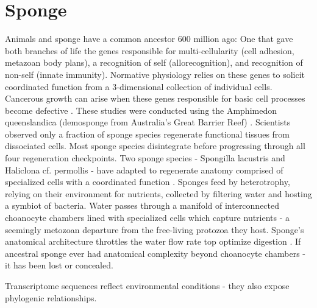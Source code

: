 \documentclass[a4paper, 11pt]{article}
\begin{document}
   
   
   \section{Sponge}
Animals and sponge have a common ancestor 600 million ago: One that gave both branches of life the genes responsible for multi-cellularity (cell adhesion, metazoan body plans), a recognition of self (allorecognition), and recognition of non-self (innate immunity). Normative physiology relies on these genes to solicit coordinated function from a 3-dimensional collection of individual cells. Cancerous growth can arise when these genes responsible for basic cell processes become defective \cite{srivastava2010amphimedon}. These studies were conducted using the Amphimedon queenslandica (demosponge from Australia's Great Barrier Reef) \cite{srivastava2010amphimedon}. 
Scientists observed only a fraction of sponge species regenerate functional tissues from dissociated cells. Most sponge species disintegrate before progressing through all four regeneration checkpoints. Two sponge species - Spongilla lacustris and Haliclona cf. permollis - have adapted to regenerate anatomy comprised of specialized cells with a coordinated function \cite{eerkes2015sponge}. 
Sponges feed by heterotrophy, relying on their environment for nutrients, collected by filtering water and hosting a symbiot of bacteria. Water passes through a manifold of interconnected choanocyte chambers lined with specialized cells which capture nutrients - a seemingly metozoan departure from the free-living protozoa they host.  Sponge's anatomical architecture throttles the water flow rate top optimize digestion \cite{riesgo2014analysis}.
If ancestral sponge ever had anatomical complexity beyond choanocyte chambers - it has been lost or concealed. 
 
Transcriptome sequences reflect environmental conditions - they also expose phylogenic relationships. 
\end{document}

